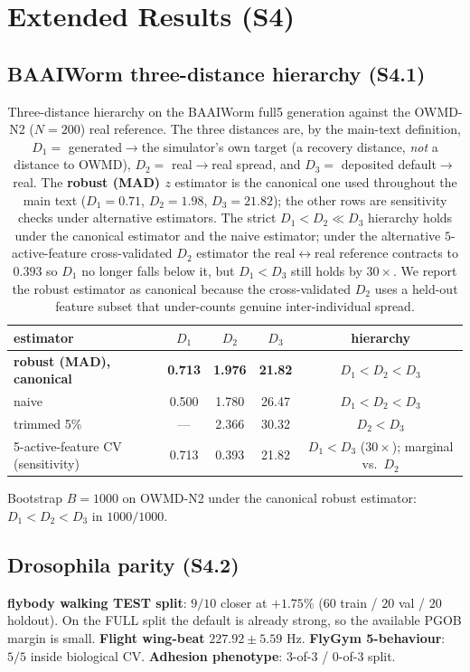 \documentclass[11pt]{article}
\begin{document}
\section{Extended Results (S4)}
\label{si:results}

\subsection{BAAIWorm three-distance hierarchy (S4.1)}
\begin{table}[H]\centering\small
\caption{Three-distance hierarchy on the BAAIWorm full5 generation against the OWMD-N2 ($N{=}200$) real reference. The three distances are, by the main-text definition, $D_1{=}$ generated$\to$the simulator's own target (a recovery distance, \emph{not} a distance to OWMD), $D_2{=}$ real$\to$real spread, and $D_3{=}$ deposited default$\to$real. The \textbf{robust (MAD) $z$} estimator is the canonical one used throughout the main text ($D_1{=}0.71$, $D_2{=}1.98$, $D_3{=}21.82$); the other rows are sensitivity checks under alternative estimators. The strict $D_1{<}D_2{\ll}D_3$ hierarchy holds under the canonical estimator and the naive estimator; under the alternative $5$-active-feature cross-validated $D_2$ estimator the real$\leftrightarrow$real reference contracts to $0.393$ so $D_1$ no longer falls below it, but $D_1{<}D_3$ still holds by $30\times$. We report the robust estimator as canonical because the cross-validated $D_2$ uses a held-out feature subset that under-counts genuine inter-individual spread.}
\begin{tabular}{lcccc}\toprule
estimator & $D_1$ & $D_2$ & $D_3$ & hierarchy \\\midrule
\textbf{robust (MAD), canonical} & \textbf{0.713} & \textbf{1.976} & \textbf{21.82} & $D_1<D_2<D_3$ \\
naive & 0.500 & 1.780 & 26.47 & $D_1<D_2<D_3$ \\
trimmed 5\% & --- & 2.366 & 30.32 & $D_2<D_3$ \\
5-active-feature CV (sensitivity) & 0.713 & 0.393 & 21.82 & $D_1<D_3$ ($30\times$); marginal vs.\ $D_2$ \\\bottomrule
\end{tabular}
\end{table}
Bootstrap $B{=}1000$ on OWMD-N2 under the canonical robust estimator: $D_1<D_2<D_3$ in $1000/1000$.

\subsection{Drosophila parity (S4.2)}
\textbf{flybody walking TEST split}: $9/10$ closer at $+1.75\%$ ($60$ train / $20$ val / $20$ holdout). On the FULL split the default is already strong, so the available PGOB margin is small. \textbf{Flight wing-beat} $227.92\pm 5.59$ Hz. \textbf{FlyGym 5-behaviour}: $5/5$ inside biological CV. \textbf{Adhesion phenotype}: 3-of-3 / 0-of-3 split.
\end{document}
